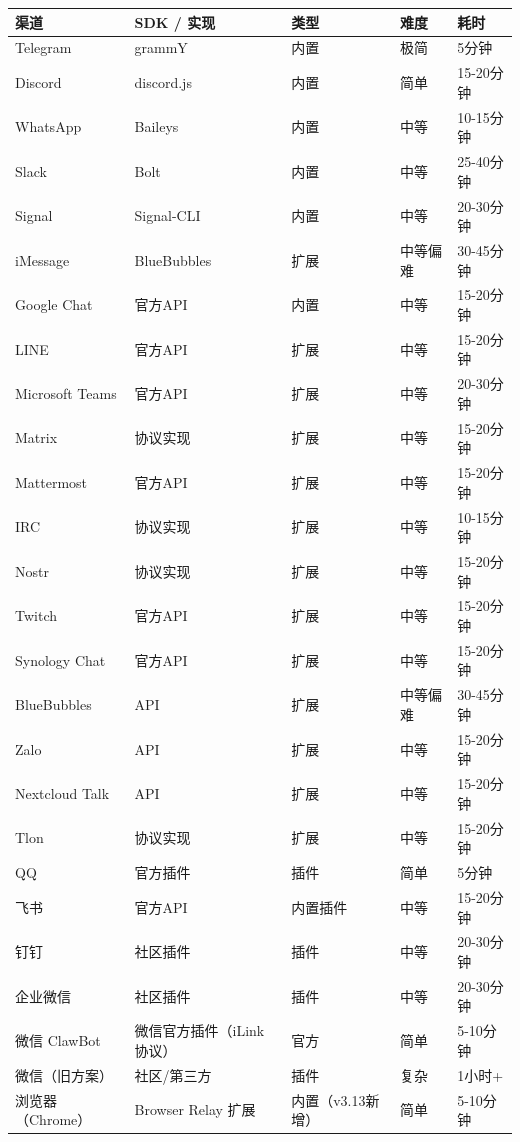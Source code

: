 \documentclass[
  10
]{article}
\newcounter{none} %
\begin{document}
{\def\LTcaptype{none} %
\begin{longtable}[]{@{}|l|l|l|l|l|@{}}
\toprule\noalign{}
\endhead
\bottomrule\noalign{}
\endlastfoot
\hline
渠道 & SDK / 实现 & 类型 & 难度 & 耗时 \\
\hline
Telegram & grammY & 内置 & 极简 & 5分钟 \\
\hline
Discord & discord.js & 内置 & 简单 & 15-20分钟 \\
\hline
WhatsApp & Baileys & 内置 & 中等 & 10-15分钟 \\
\hline
Slack & Bolt & 内置 & 中等 & 25-40分钟 \\
\hline
Signal & Signal-CLI & 内置 & 中等 & 20-30分钟 \\
\hline
iMessage & BlueBubbles & 扩展 & 中等偏难 & 30-45分钟 \\
\hline
Google Chat & 官方API & 内置 & 中等 & 15-20分钟 \\
\hline
LINE & 官方API & 扩展 & 中等 & 15-20分钟 \\
\hline
Microsoft Teams & 官方API & 扩展 & 中等 & 20-30分钟 \\
\hline
Matrix & 协议实现 & 扩展 & 中等 & 15-20分钟 \\
\hline
Mattermost & 官方API & 扩展 & 中等 & 15-20分钟 \\
\hline
IRC & 协议实现 & 扩展 & 中等 & 10-15分钟 \\
\hline
Nostr & 协议实现 & 扩展 & 中等 & 15-20分钟 \\
\hline
Twitch & 官方API & 扩展 & 中等 & 15-20分钟 \\
\hline
Synology Chat & 官方API & 扩展 & 中等 & 15-20分钟 \\
\hline
BlueBubbles & API & 扩展 & 中等偏难 & 30-45分钟 \\
\hline
Zalo & API & 扩展 & 中等 & 15-20分钟 \\
\hline
Nextcloud Talk & API & 扩展 & 中等 & 15-20分钟 \\
\hline
Tlon & 协议实现 & 扩展 & 中等 & 15-20分钟 \\
\hline
QQ & 官方插件 & 插件 & 简单 & 5分钟 \\
\hline
飞书 & 官方API & 内置插件 & 中等 & 15-20分钟 \\
\hline
钉钉 & 社区插件 & 插件 & 中等 & 20-30分钟 \\
\hline
企业微信 & 社区插件 & 插件 & 中等 & 20-30分钟 \\
\hline
微信 ClawBot & 微信官方插件（iLink协议） & 官方 & 简单 & 5-10分钟 \\
\hline
微信（旧方案） & 社区/第三方 & 插件 & 复杂 & 1小时+ \\
\hline
浏览器（Chrome） & Browser Relay 扩展 & 内置（v3.13新增） & 简单 &
5-10分钟 \\
\hline
\end{longtable}
}
\end{document}
